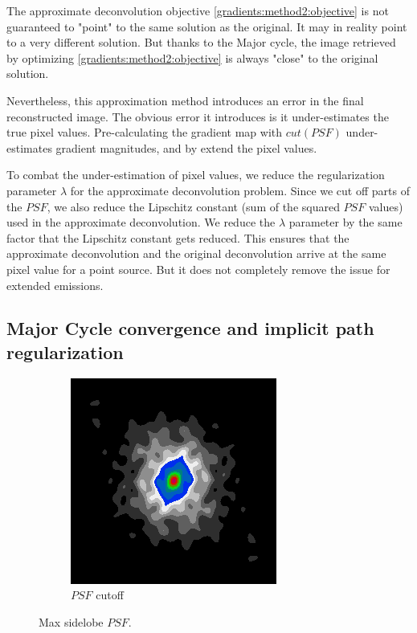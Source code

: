 The approximate deconvolution objective \eqref{gradients:method2:objective} is not guaranteed to "point" to the same solution as the original. It may in reality point to a very different solution. But thanks to the Major cycle, the image retrieved by optimizing \eqref{gradients:method2:objective} is always "close" to the original solution.

Nevertheless, this approximation method introduces an error in the final reconstructed image. The obvious error it introduces is it under-estimates the true pixel values. Pre-calculating the gradient map with $cut(PSF)$ under-estimates gradient magnitudes, and by extend the pixel values.

To combat the under-estimation of pixel values, we reduce the regularization parameter $\lambda$ for the approximate deconvolution problem. Since we cut off parts of the $PSF$, we also reduce the Lipschitz constant (sum of the squared $PSF$ values) used in the approximate deconvolution. We reduce the $\lambda$ parameter by the same factor that the Lipschitz constant gets reduced. This ensures that the approximate deconvolution and the original deconvolution arrive at the same pixel value for a point source. But it does not completely remove the issue for extended emissions.

\subsection{Major Cycle convergence and implicit path regularization}\label{gradients:pathreg}

\begin{figure}[h]
	\centering
	\begin{subfigure}[b]{0.3\linewidth}
		\includegraphics[width=\linewidth]{./chapters/03.distribution/simulated/psf.png}
		\caption{$PSF$ cutoff}
	\end{subfigure}
	
	\caption{Max sidelobe $PSF$.}
\end{figure} 

